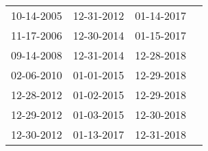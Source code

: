 \begin{supertabular}{llll}
 10-14-2005 &  12-31-2012 &  01-14-2017 \\
 11-17-2006 &  12-30-2014 &  01-15-2017 \\
 09-14-2008 &  12-31-2014 &  12-28-2018 \\
 02-06-2010 &  01-01-2015 &  12-29-2018 \\
 12-28-2012 &  01-02-2015 &  12-29-2018 \\
 12-29-2012 &  01-03-2015 &  12-30-2018 \\
 12-30-2012 &  01-13-2017 &  12-31-2018 \\
\end{supertabular}
